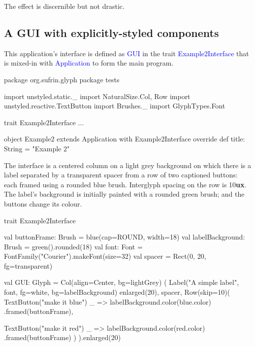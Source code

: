 \documentclass[12pt,a4paper]{article}
\def\ux{\textbf{ux}\xspace}
\def\Scala#1{\textcolor{blue}{\textsf{#1}}}
\def\SS#1{\subsection{#1}}
\begin{document}
\pagebreak[4]
The effect is discernible but not drastic.
\begin{center}
\quad
{}
\end{center}

\SS{A GUI with explicitly-styled components}

This application's interface is defined as \Scala{GUI} 
in the trait \Scala{Example2Interface} that is mixed-in with
\Scala{Application} to form the main program.

\begin{scala}
package org.sufrin.glyph
package tests

import unstyled.static._
import NaturalSize.{Col, Row}
import unstyled.reactive.TextButton
import Brushes._
import GlyphTypes.Font
\end{scala}

\begin{scala}
trait Example2Interface { ... }

object Example2 extends Application  with Example2Interface {
  override def title: String = "Example 2"
}
\end{scala}

\begin{center}
\end{center}

The interface is a centered column on a light grey background on
which there is a label separated by a transparent spacer
from a row of two captioned buttons: each framed using a
rounded blue brush. Interglyph spacing on the row is
10\ux.  The label's background is initially painted with
a rounded green brush; and the buttons
change its colour.

\begin{scala}
trait Example2Interface {
  val buttonFrame: Brush =
        blue(cap=ROUND, width=18)
  val labelBackground: Brush =
        green().rounded(18)
  val font: Font  =
        FontFamily("Courier").makeFont(size=32)
  val spacer =
      Rect(0, 20, fg=transparent)

  val GUI: Glyph = Col(align=Center, bg=lightGrey) (
    Label("A simple label", font,
          fg=white,
          bg=labelBackground) enlarged(20),
    spacer,
    Row(skip=10)(
        TextButton("make it blue")
           { _ => labelBackground.color(blue.color) }
           .framed(buttonFrame),
           
        TextButton("make it red")
           { _ => labelBackground.color(red.color) }
           .framed(buttonFrame)
    )
  ).enlarged(20)
}
\end{scala}
\end{document}
